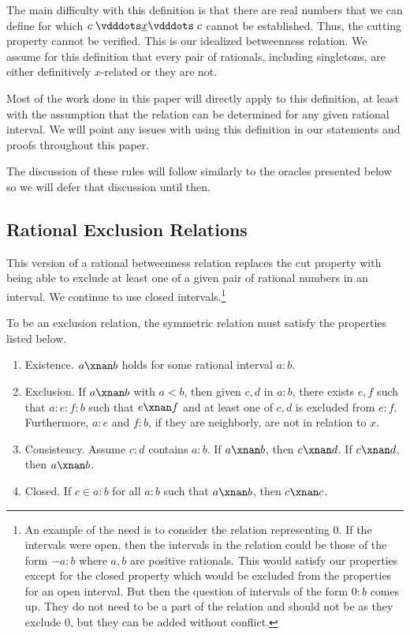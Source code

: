 \documentclass[12pt]{article}
\begin{document}
The main difficulty with this definition is that there are real numbers that we can define for which $c \xrel c$ cannot be established. Thus, the cutting property cannot be verified. This is our idealized betweenness relation. We assume for this definition that every pair of rationals, including singletons, are either definitively $x$-related or they are not. 

Most of the work done in this paper will directly apply to this definition, at least with the assumption that the relation can be determined for any given rational interval. We will point any issues with using this definition in our statements and proofs throughout this paper. 

The discussion of these rules will follow similarly to the oracles presented below so we will defer that discussion until then. 

\subsection{Rational Exclusion Relations}

This version of a rational betweenness relation replaces the cut property with being able to exclude at least one of a given pair of rational numbers in an interval. We continue to use closed intervals.\footnote{An example of the need is to consider the relation representing 0. If the intervals were open, then the intervals in the relation could be those of the form $-a:b$ where $a, b$ are positive rationals. This would satisfy our properties except for the closed property which would be excluded from the properties for an open interval. But then the question of intervals of the form $0:b$ comes up. They do not need to be a part of the relation and should not be as they exclude 0, but they can be added without conflict.    }

To be an exclusion relation, the symmetric relation must satisfy the properties listed below.
\begin{enumerate}
    \item Existence. $a \xnan b$ holds for some rational interval $a:b$.
    \item Exclusion. If $a \xnan b$ with $a < b$, then given $c, d$ in $a:b$, there exists $e, f$ such that  $a:e:f:b$ such that $e \xnan f$ and at least one of $c, d$ is excluded from  $e:f$. Furthermore, $a:e$ and $f:b$, if they are neighborly, are not in relation to $x$. 
    \item Consistency. Assume $c:d$ contains $a:b$. If $a \xnan b$, then $ c \xnan d$. If \sout{$c\xnan d$}, then \sout{$a\xnan b$}. 
    \item Closed. If $c \in a:b$ for all $a:b$ such that $a \xnan b$, then $c \xnan c$. 
\end{enumerate}
\end{document}
